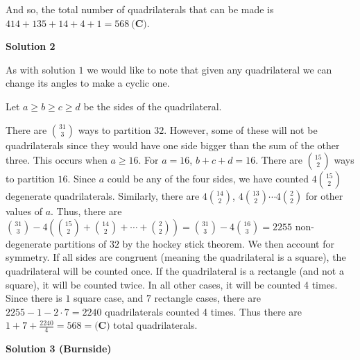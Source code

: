 \begin{enumerate}
 
And so, the total number of quadrilaterals that can be made is $414 + 135 + 14 + 4 + 1 = \boxed{568\ \textbf{(C)}}$.

 



\textbf{Solution 2}

As with solution $1$ we would  like to note that given any quadrilateral we can change its angles to make a cyclic one.

 Let $a \ge b \ge c\ge d$ be the sides of the quadrilateral.

 There are $\binom{31}{3}$ ways to partition $32$. However, some of these will not be quadrilaterals since they would have one side bigger than the sum of the other three.  This occurs when $a \ge 16$.  For $a=16$, $b+c+d=16$. There are $\binom{15}{2}$ ways to partition $16$. Since $a$ could be any of the four sides, we have counted $4\binom{15}{2}$ degenerate quadrilaterals. Similarly, there are $4\binom{14}{2}$, $4\binom{13}{2} \cdots 4\binom{2}{2}$ for other values of $a$.  Thus, there are $\binom{31}{3} - 4\left(\binom{15}{2}+\binom{14}{2}+\cdots+\binom{2}{2}\right) = \binom{31}{3} - 4\binom{16}{3} = 2255$ non-degenerate partitions of $32$ by the hockey stick theorem.  We then account for symmetry. If all sides are congruent (meaning the quadrilateral is a square), the quadrilateral will be counted once. If the quadrilateral is a rectangle (and not a square), it will be counted twice. In all other cases, it will be counted 4 times. Since there is $1$ square case, and $7$ rectangle cases, there are $2255-1-2\cdot7=2240$ quadrilaterals counted 4 times. Thus there are $1+7+\frac{2240}{4} = \boxed{568} = \boxed{\textbf{(C)}}$ total quadrilaterals.

 



\textbf{Solution 3 (Burnside)}


\end{enumerate}
